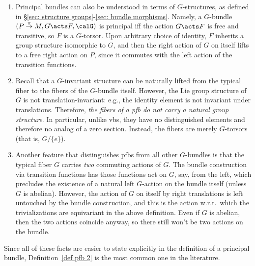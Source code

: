 \begin{rem}
    \begin{enumerate}
        \item Principal bundles can also be understood in terms of $G$-structures, as defined in \S\ref{sec: structure groups}-\ref{sec: bundle morphisms}. Namely, a $G$-bundle $(P\overset{\pi}{\to}M,G\acts F,\calG)$ is principal iff the action $G\acts F$ is free and transitive, so $F$ is a $G$-torsor. Upon arbitrary choice of identity, $F$ inherits a group structure isomorphic to $G$, and then the right action of $G$ on itself lifts to a free right action on $P$, since it commutes with the left action of the transition functions.
        
        \item Recall that a $G$-invariant structure can be naturally lifted from the typical fiber to the fibers of the $G$-bundle itself. However, the Lie group structure of $G$ is not translation-invariant: e.g., the identity element is not invariant under translations. Therefore, \emph{the fibers of a \gls{pfb} do not carry a natural group structure}. In particular, unlike \glspl{vb}, they have no distinguished elements and therefore no analog of a zero section. Instead, the fibers are merely $G$-torsors (that is, $G\slash \{e\}$).

        \item Another feature that distinguishes \glspl{pfb} from all other $G$-bundles is that the typical fiber $G$ carries \emph{two} commuting actions of $G$. The bundle construction via transition functions has those functions act on $G$, say, from the left, which precludes the existence of a natural left $G$-action on the bundle itself (unless $G$ is abelian). However, the action of $G$ on itself by right translations is left untouched by the bundle construction, and this is the action w.r.t.\ which the trivializations are equivariant in the above definition. Even if $G$ is abelian, then the two actions coincide anyway, so there still won't be two actions on the bundle.
    \end{enumerate}
    Since all of these facts are easier to state explicitly in the definition of a principal bundle, Definition~\ref{def pfb 2} is the most common one in the literature.
\end{rem}




